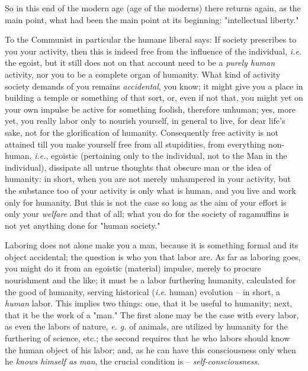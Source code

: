 \documentclass[a4paper]{book}
\begin{document}
So in this end of the modern age (age of the moderns) there returns again, as 
the main point, what had been the main point at its beginning: "{}intellectual 
liberty."{}

To the Communist in particular the humane liberal says: If society prescribes 
to you your activity, then this is indeed free from the influence of the 
individual, \textit{i.e.} the egoist, but it still does not on that account 
need to be a \textit{purely human} activity, nor you to be a complete organ of 
humanity. What kind of activity society demands of you remains 
\textit{accidental}, you know; it might give you a place in building a temple 
or something of that sort, or, even if not that, you might yet on your own 
impulse be active for something foolish, therefore unhuman; yes, more yet, you 
really labor only to nourish yourself, in general to live, for dear life's 
sake, not for the glorification of humanity. Consequently free activity is not 
attained till you make yourself free from all stupidities, from everything 
non-human, \textit{i.e.}, egoistic (pertaining only to the individual, not to 
the Man in the individual), dissipate all untrue thoughts that obscure man or 
the idea of humanity: in short, when you are not merely unhampered in your 
activity, but the substance too of your activity is only what is human, and 
you live and work only for humanity. But this is not the case so long as the 
aim of your effort is only your \textit{welfare} and that of all; what you do 
for the society of ragamuffins is not yet anything done for "{}human 
society."{}

Laboring does not alone make you a man, because it is something formal and its 
object accidental; the question is who you that labor are. As far as laboring 
goes, you might do it from an egoistic (material) impulse, merely to procure 
nourishment and the like; it must be a labor furthering humanity, calculated 
for the good of humanity, serving historical (\textit{i.e.} human) evolution 
-- in short, a \textit{human} labor. This implies two things: one, that it be 
useful to humanity; next, that it be the work of a "{}man."{} The first alone 
may be the case with every labor, as even the labors of nature, \textit{e. g.} 
of animals, are utilized by humanity for the furthering of science, etc.; the 
second requires that he who labors should know the human object of his labor; 
and, as he can have this consciousness only when he \textit{knows himself as 
man}, the crucial condition is -- \textit{self-consciousness.}
\end{document}

